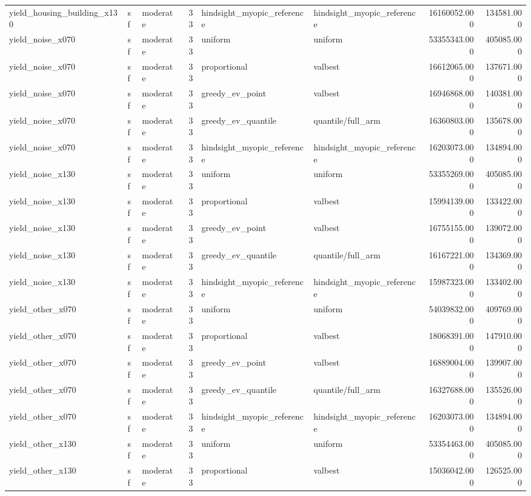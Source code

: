 \begin{tabular}{lllrllrr}
yield\_housing\_building\_x130 & sf & moderate & 33 & hindsight\_myopic\_reference & hindsight\_myopic\_reference & 16160052.000 & 134581.000 \\
yield\_noise\_x070 & sf & moderate & 33 & uniform & uniform & 53355343.000 & 405085.000 \\
yield\_noise\_x070 & sf & moderate & 33 & proportional & valbest & 16612065.000 & 137671.000 \\
yield\_noise\_x070 & sf & moderate & 33 & greedy\_ev\_point & valbest & 16946868.000 & 140381.000 \\
yield\_noise\_x070 & sf & moderate & 33 & greedy\_ev\_quantile & quantile/full\_arm & 16360803.000 & 135678.000 \\
yield\_noise\_x070 & sf & moderate & 33 & hindsight\_myopic\_reference & hindsight\_myopic\_reference & 16203073.000 & 134894.000 \\
yield\_noise\_x130 & sf & moderate & 33 & uniform & uniform & 53355269.000 & 405085.000 \\
yield\_noise\_x130 & sf & moderate & 33 & proportional & valbest & 15994139.000 & 133422.000 \\
yield\_noise\_x130 & sf & moderate & 33 & greedy\_ev\_point & valbest & 16755155.000 & 139072.000 \\
yield\_noise\_x130 & sf & moderate & 33 & greedy\_ev\_quantile & quantile/full\_arm & 16167221.000 & 134369.000 \\
yield\_noise\_x130 & sf & moderate & 33 & hindsight\_myopic\_reference & hindsight\_myopic\_reference & 15987323.000 & 133402.000 \\
yield\_other\_x070 & sf & moderate & 33 & uniform & uniform & 54039832.000 & 409769.000 \\
yield\_other\_x070 & sf & moderate & 33 & proportional & valbest & 18068391.000 & 147910.000 \\
yield\_other\_x070 & sf & moderate & 33 & greedy\_ev\_point & valbest & 16889004.000 & 139907.000 \\
yield\_other\_x070 & sf & moderate & 33 & greedy\_ev\_quantile & quantile/full\_arm & 16327688.000 & 135526.000 \\
yield\_other\_x070 & sf & moderate & 33 & hindsight\_myopic\_reference & hindsight\_myopic\_reference & 16203073.000 & 134894.000 \\
yield\_other\_x130 & sf & moderate & 33 & uniform & uniform & 53354463.000 & 405085.000 \\
yield\_other\_x130 & sf & moderate & 33 & proportional & valbest & 15036042.000 & 126525.000 \\

\end{tabular}
